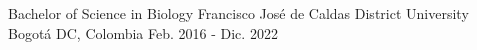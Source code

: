 


\begin{cventries}


\cventry
{Bachelor of Science in Biology} %
{Francisco José de Caldas District University} %
{Bogotá DC, Colombia} %
{Feb. 2016 - Dic. 2022} %
{ %
}


\end{cventries}




